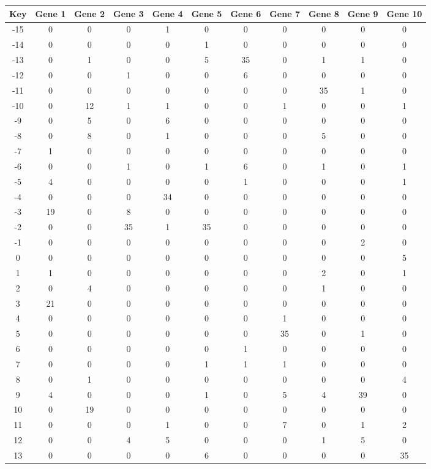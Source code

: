 \begin{tabular}{|c|c|c|c|c|c|c|c|c|c|c|}
\hline
Key & Gene 1 & Gene 2 & Gene 3 & Gene 4 & Gene 5 & Gene 6 & Gene 7 & Gene 8 & Gene 9 & Gene 10 \\
\hline
-15 & 0 & 0 & 0 & 1 & 0 & 0 & 0 & 0 & 0 & 0 \\
-14 & 0 & 0 & 0 & 0 & 1 & 0 & 0 & 0 & 0 & 0 \\
-13 & 0 & 1 & 0 & 0 & 5 & 35 & 0 & 1 & 1 & 0 \\
-12 & 0 & 0 & 1 & 0 & 0 & 6 & 0 & 0 & 0 & 0 \\
-11 & 0 & 0 & 0 & 0 & 0 & 0 & 0 & 35 & 1 & 0 \\
-10 & 0 & 12 & 1 & 1 & 0 & 0 & 1 & 0 & 0 & 1 \\
-9 & 0 & 5 & 0 & 6 & 0 & 0 & 0 & 0 & 0 & 0 \\
-8 & 0 & 8 & 0 & 1 & 0 & 0 & 0 & 5 & 0 & 0 \\
-7 & 1 & 0 & 0 & 0 & 0 & 0 & 0 & 0 & 0 & 0 \\
-6 & 0 & 0 & 1 & 0 & 1 & 6 & 0 & 1 & 0 & 1 \\
-5 & 4 & 0 & 0 & 0 & 0 & 1 & 0 & 0 & 0 & 1 \\
-4 & 0 & 0 & 0 & 34 & 0 & 0 & 0 & 0 & 0 & 0 \\
-3 & 19 & 0 & 8 & 0 & 0 & 0 & 0 & 0 & 0 & 0 \\
-2 & 0 & 0 & 35 & 1 & 35 & 0 & 0 & 0 & 0 & 0 \\
-1 & 0 & 0 & 0 & 0 & 0 & 0 & 0 & 0 & 2 & 0 \\
0 & 0 & 0 & 0 & 0 & 0 & 0 & 0 & 0 & 0 & 5 \\
1 & 1 & 0 & 0 & 0 & 0 & 0 & 0 & 2 & 0 & 1 \\
2 & 0 & 4 & 0 & 0 & 0 & 0 & 0 & 1 & 0 & 0 \\
3 & 21 & 0 & 0 & 0 & 0 & 0 & 0 & 0 & 0 & 0 \\
4 & 0 & 0 & 0 & 0 & 0 & 0 & 1 & 0 & 0 & 0 \\
5 & 0 & 0 & 0 & 0 & 0 & 0 & 35 & 0 & 1 & 0 \\
6 & 0 & 0 & 0 & 0 & 0 & 1 & 0 & 0 & 0 & 0 \\
7 & 0 & 0 & 0 & 0 & 1 & 1 & 1 & 0 & 0 & 0 \\
8 & 0 & 1 & 0 & 0 & 0 & 0 & 0 & 0 & 0 & 4 \\
9 & 4 & 0 & 0 & 0 & 1 & 0 & 5 & 4 & 39 & 0 \\
10 & 0 & 19 & 0 & 0 & 0 & 0 & 0 & 0 & 0 & 0 \\
11 & 0 & 0 & 0 & 1 & 0 & 0 & 7 & 0 & 1 & 2 \\
12 & 0 & 0 & 4 & 5 & 0 & 0 & 0 & 1 & 5 & 0 \\
13 & 0 & 0 & 0 & 0 & 6 & 0 & 0 & 0 & 0 & 35 \\
\hline
\end{tabular}